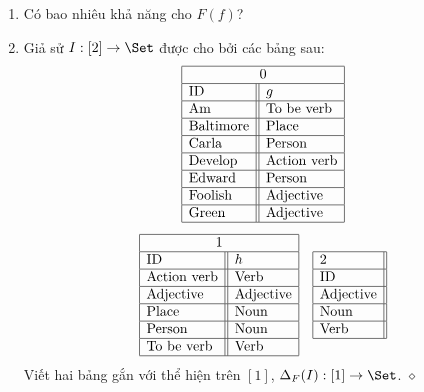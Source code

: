 \begin{enumerate}[label=\alph*.]
\item Có bao nhiêu khả năng cho $F(f)$?
\item Giả sử $I:[2]\to\Set$ được cho bởi các bảng sau:
\[
\begin{gathered}
\begin{array}{|l||l|}\hline\multicolumn{2}{|c|}{0}\\\hline\text{ID}&g\\\hline
\text{Am}&\text{To be verb}\\\hline\text{Baltimore}&\text{Place}\\\hline
\text{Carla}&\text{Person}\\\hline\text{Develop}&\text{Action verb}\\\hline
\text{Edward}&\text{Person}\\\hline\text{Foolish}&\text{Adjective}\\\hline\text{Green}&\text{Adjective}\\\hline\end{array}\\[1ex]
\begin{array}{|l||l|}\hline\multicolumn{2}{|c|}{1}\\\hline\text{ID}&h\\\hline
\text{Action verb}&\text{Verb}\\\hline\text{Adjective}&\text{Adjective}\\\hline
\text{Place}&\text{Noun}\\\hline\text{Person}&\text{Noun}\\\hline
\text{To be verb}&\text{Verb}\\\hline\end{array}
\quad
\begin{array}{|l||}\hline2\\\hline\text{ID}\\\hline
\text{Adjective}\\\hline\text{Noun}\\\hline\text{Verb}\\\hline\end{array}
\end{gathered}
\]
Viết hai bảng gắn với thể hiện trên $[1]$, $\Delta_F(I):[1]\to\Set$.
\nobreak\hfill$\diamond$
\end{enumerate}

